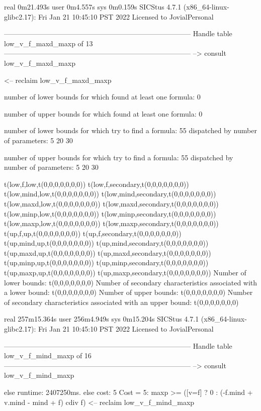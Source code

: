 real	0m21.493s
user	0m4.557s
sys	0m0.159s
SICStus 4.7.1 (x86_64-linux-glibc2.17): Fri Jan 21 10:45:10 PST 2022
Licensed to JovialPersonal


--------------------------------------------------------------------------------
Handle table low_v_f_maxd_maxp of 13
--------------------------------------------------------------------------------
--> consult low_v_f_maxd_maxp

<-- reclaim low_v_f_maxd_maxp

number of lower bounds for which found at least one formula: 0

number of upper bounds for which found at least one formula: 0

number of lower bounds for which try to find a formula: 55
dispatched by number of parameters: 5  20  30

number of upper bounds for which try to find a formula: 55
dispatched by number of parameters: 5  20  30

t(low,f,low,t(0,0,0,0,0,0,0))
t(low,f,secondary,t(0,0,0,0,0,0,0))
t(low,mind,low,t(0,0,0,0,0,0,0))
t(low,mind,secondary,t(0,0,0,0,0,0,0))
t(low,maxd,low,t(0,0,0,0,0,0,0))
t(low,maxd,secondary,t(0,0,0,0,0,0,0))
t(low,minp,low,t(0,0,0,0,0,0,0))
t(low,minp,secondary,t(0,0,0,0,0,0,0))
t(low,maxp,low,t(0,0,0,0,0,0,0))
t(low,maxp,secondary,t(0,0,0,0,0,0,0))
t(up,f,up,t(0,0,0,0,0,0,0))
t(up,f,secondary,t(0,0,0,0,0,0,0))
t(up,mind,up,t(0,0,0,0,0,0,0))
t(up,mind,secondary,t(0,0,0,0,0,0,0))
t(up,maxd,up,t(0,0,0,0,0,0,0))
t(up,maxd,secondary,t(0,0,0,0,0,0,0))
t(up,minp,up,t(0,0,0,0,0,0,0))
t(up,minp,secondary,t(0,0,0,0,0,0,0))
t(up,maxp,up,t(0,0,0,0,0,0,0))
t(up,maxp,secondary,t(0,0,0,0,0,0,0))
Number of lower bounds:                                             t(0,0,0,0,0,0,0)
Number of secondary characteristics associated with a lower bound:  t(0,0,0,0,0,0,0)
Number of upper bounds:                                             t(0,0,0,0,0,0,0)
Number of secondary characteristics associated with an upper bound: t(0,0,0,0,0,0,0)

real	257m15.364s
user	256m4.949s
sys	0m15.204s
SICStus 4.7.1 (x86_64-linux-glibc2.17): Fri Jan 21 10:45:10 PST 2022
Licensed to JovialPersonal


--------------------------------------------------------------------------------
Handle table low_v_f_mind_maxp of 16
--------------------------------------------------------------------------------
--> consult low_v_f_mind_maxp

else runtime: 2407250ms. else cost: 5
Cost =  5:  maxp >= ([v=f] ? 0 : (-f.mind + v.mind - mind + f) cdiv f) %
<-- reclaim low_v_f_mind_maxp

